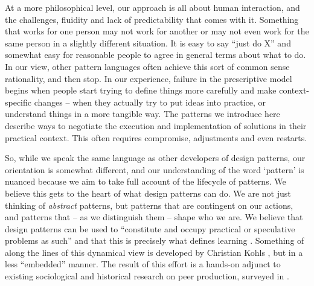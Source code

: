 At a more philosophical level, our approach is all about human interaction, and the challenges, fluidity and lack of predictability that comes with it.  Something that works for one person may not work for another or may not even work for the same person in a slightly different situation.  It is easy to say ``just do X'' and somewhat easy for reasonable people to agree in general terms about what to do.  In our view, other pattern languages often achieve this sort of common sense rationality, and then stop.  In our experience, failure in the prescriptive model begins when people start trying to define things more carefully and make context-specific changes -- when they actually try to put ideas into practice, or understand things in a more tangible way. The patterns we introduce here describe ways to negotiate the execution and implementation of solutions in their practical context.  This often requires compromise, adjustments and even restarts.  

So, while we speak the same language as other developers of design patterns, our orientation is somewhat different, and our understanding of the word `pattern' is nuanced because we aim to take full account of the lifecycle of patterns.  We believe this gets to the heart of what design patterns can do.  We are not just thinking of \emph{abstract} patterns, but patterns that are contingent on our actions, and patterns that -- as we distinguish them -- shape who we are.   We believe that design patterns can be used to ``constitute and occupy practical or speculative problems as such'' and that this is precisely what defines learning \cite[p. 204]{deleuze1994difference}.   Something of along the lines of this dynamical view
is developed by Christian Kohls \cite{kohls2010structure,kohls2011structure}, but in a less ``embedded'' manner.
%
The result of this effort is a hands-on adjunct to existing sociological and historical research on peer production, surveyed in \cite{benkler2015peer}.  

